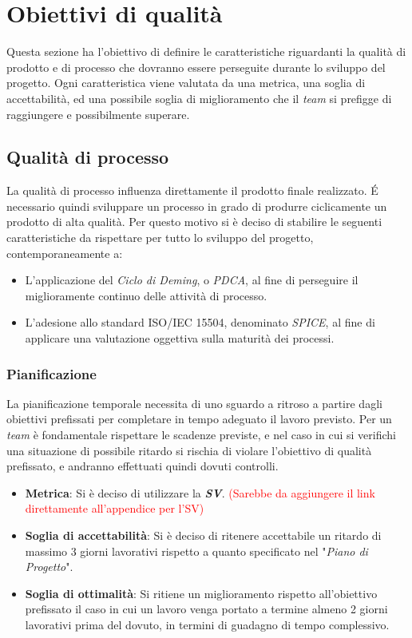 \section{Obiettivi di qualità}
Questa sezione ha l'obiettivo di definire le caratteristiche riguardanti la qualità di prodotto e di processo che dovranno essere perseguite durante lo sviluppo del progetto.
Ogni caratteristica viene valutata da una metrica, una soglia di accettabilità, ed una possibile soglia di miglioramento che il \emph{team} si prefigge di raggiungere e possibilmente superare.

\subsection{Qualità di processo}
La qualità di processo influenza direttamente il prodotto finale realizzato. É necessario quindi sviluppare un processo in grado di produrre ciclicamente un prodotto di alta qualità. Per questo motivo si è deciso di stabilire le seguenti caratteristiche da rispettare per tutto lo sviluppo del progetto, contemporaneamente a:
\begin{itemize}
\item L'applicazione del \emph{Ciclo di Deming}, o \emph{PDCA}, al fine di perseguire il miglioramente continuo delle attività di processo.
\item L'adesione allo standard ISO/IEC 15504, denominato \emph{SPICE}, al fine di applicare una valutazione oggettiva sulla maturità dei processi.
\end{itemize} 

\subsubsection{Pianificazione}
La pianificazione temporale necessita di uno sguardo a ritroso a partire dagli obiettivi prefissati per completare in tempo adeguato il lavoro previsto. Per un \emph{team} è fondamentale rispettare le scadenze previste, e nel caso in cui si verifichi una situazione di possibile ritardo si rischia di violare l'obiettivo di qualità prefissato, e andranno effettuati quindi dovuti controlli.
\begin{itemize}
	\item \textbf{Metrica}: Si è deciso di utilizzare la \emph{\textbf{SV}}. \textcolor{red}{(Sarebbe da aggiungere il link direttamente all'appendice per l'SV)}
	\item \textbf{Soglia di accettabilità}: Si è deciso di ritenere accettabile un ritardo di massimo 3 giorni lavorativi rispetto a quanto specificato nel "\emph{Piano di Progetto}".
	\item \textbf{Soglia di ottimalità}: Si ritiene un miglioramento rispetto all'obiettivo prefissato il caso in cui un lavoro venga portato a termine almeno 2 giorni lavorativi prima del dovuto, in termini di guadagno di tempo complessivo.
\end{itemize}


